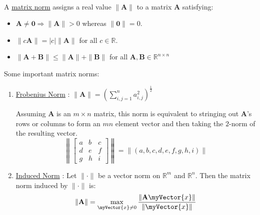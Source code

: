 \documentclass{book}
\newcommand{\teachComment}{
   \color{Orange}%
   \fontsize{12}{14}\selectfont%
}
\newenvironment{myTindent}{%
   \begin{adjustwidth}{7.5em}{0em}%
}{%
   \end{adjustwidth}%
}
\newcommand{\udefine}[1]{%
   {\setulcolor{Red}%
   \setul{0.14em}{0.07em}%
   \ul{#1}}%
}
\newcommand{\mySepTwo}[1][.]{%
   {\noindent\color{#1}{\rule{6.5in}{0.5mm}}}\\%
}
\newcommand{\retTwo}{\hfill\bigbreak}
\newcommand{\mVec}[1]{\myVector{#1}}
\newcommand{\mMat}[1]{\mathbf{#1}}
\begin{document}
   \mySepTwo

   A \udefine{matrix norm} assigns a real value $\|\mMat{A}\|$ to a matrix $\mMat{A}$ satisfying:
   \begin{itemize}
      \item $\mMat{A} \neq \mMat{0} \Longrightarrow \|\mMat{A}\| > 0$ whereas $\| \mMat{0} \| = 0$.
      \item $\| c\mMat{A} \| = \lvert c \rvert \| \mMat{A} \|$ for all $c \in \mathbb{R}$.
      \item $\|\mMat{A}+\mMat{B}\| \leq \|\mMat{A}\| + \|\mMat{B}\|$ for all $\mMat{A}, \mMat{B} \in \mathbb{R}^{n\times n}$
   \end{itemize} \retTwo

   Some important matrix norms:
   \begin{enumerate}
      \item \udefine{Frobenius Norm}: $\| \mMat{A} \| = \left({\displaystyle\sum_{i,j=1}^n{a_{i,j}^2}}\right)^\frac{1}{2}$
      {\begin{myTindent} \teachComment
         Assuming $\mMat{A}$ is an $m\times n$ matrix, this norm is equivalent to stringing out $\mMat{A}$'s rows or columns to form an $mn$ element vector and then taking the $2$-norm of the resulting vector.
         \[
         \left\|\begin{bmatrix}
            a & b & c \\ d & e & f \\ g & h & i
         \end{bmatrix}\right\| = \left\|(a, b, c, d, e, f, g, h, i)\right\|\]
      \end{myTindent}}
      \item \udefine{Induced Norm}: Let $\|\cdot\|$ be a vector norm on $\mathbb{R}^m$ and $\mathbb{R}^n$. Then the matrix norm induced by $\|\cdot \|$ is:  \[\|\mMat{A}\| = \max\limits_{\mVec{x} \neq 0}{\frac{\|\mMat{A}\mVec{x}\|}{\|\mVec{x}\|}}\]
   \end{enumerate}
   \newpage
   
\end{document}

